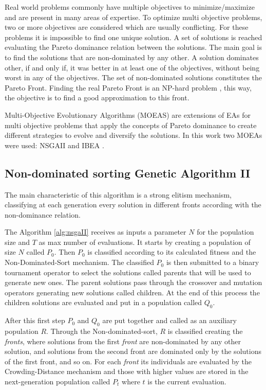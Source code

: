 Real world problems commonly have multiple objectives to minimize/maximize and are present in many areas of expertise. To optimize multi objective problems, two or more objectives are considered which are usually conflicting. For these problems it is impossible to find one unique solution. A set of solutions is reached evaluating the Pareto dominance relation \cite{pareto} between the solutions. The main goal is to find the solutions that are non-dominated by any other. A solution dominates other, if and only if, it was better in at least one of the objectives, without being worst in any of the objectives. The set of non-dominated solutions constitutes the Pareto Front. Finding the real Pareto Front is an NP-hard problem \cite{fonseca2005tutorial}, this way, the objective is to find a good approximation to this front.


Multi-Objective Evolutionary Algorithms (MOEAS) are extensions of EAs for multi objective problems that apply the concepts of Pareto dominance to create different strategies to evolve and diversify the solutions. In this work two MOEAs were used: NSGAII \cite{deb2002fast} and IBEA \cite{zitzler2004indicator}.


\subsection{Non-dominated sorting Genetic Algorithm II}


The main characteristic of this algorithm is a strong elitism mechanism, classifying at each generation every solution in different fronts according with the non-dominance relation.


The Algorithm \ref{alg:nsgaII} receives as inputs a parameter $N$ for the population size and $T$ as max number of evaluations. It starts by creating a population of size $N$ called $P_0$. Then $P_0$ is classified according to its calculated fitness and the Non-Dominated-Sort mechanism. The classified $P_0$ is then submitted to a binary tournament operator to select the solutions called parents that will be used to generate new ones. The parent solutions pass through the crossover and mutation operators generating new solutions called children. At the end of this process the children solutions are evaluated and put in a population called $Q_0$.


After this first step $P_0$ and $Q_0$ are put together and called as an auxiliary population $R$. Through the Non-dominated-sort, $R$ is classified creating the \textit{fronts}, where solutions from the first \textit{front} are non-dominated by any other solution, and solutions from the second front are dominated only by the solutions of the first front, and so on. For each \textit{front} its individuals are evaluated by the Crowding-Distance mechanism and those with higher values are stored in the next-generation population called $P_t$ where $t$ is the current evaluation.


